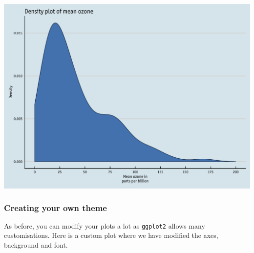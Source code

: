 \documentclass[]{article}
\begin{document}
\begin{center}\includegraphics{0_all_posts_pdf/density_11-1} \end{center}

\subsubsection{Creating your own theme}\label{creating-your-own-theme-7}

As before, you can modify your plots a lot as \texttt{ggplot2} allows
many customisations. Here is a custom plot where we have modified the
axes, background and font.
\end{document}
